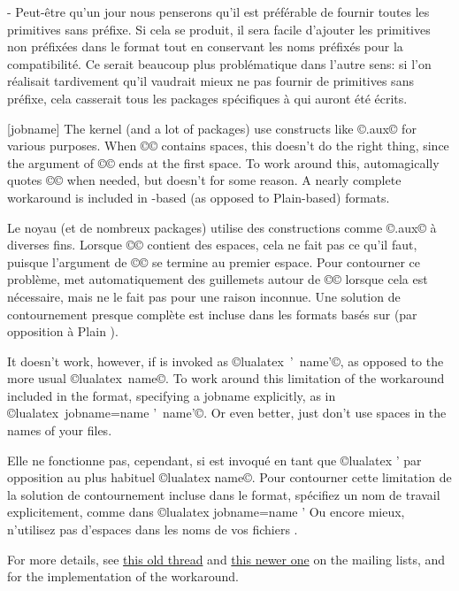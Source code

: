 \documentclass{lltxdoc}
\begin{document}
{- Peut-être qu'un jour nous penserons qu'il est préférable de fournir toutes les primitives sans préfixe. Si cela se produit, il sera facile d'ajouter les primitives non préfixées dans le format tout en conservant les noms préfixés pour la compatibilité. Ce serait beaucoup plus problématique dans l'autre sens: si l'on réalisait tardivement qu'il vaudrait mieux ne pas fournir de primitives sans préfixe, cela casserait tous les packages spécifiques à \luatex qui auront été écrits.

[jobname]
The \latex kernel (and a lot of packages) use constructs like
©\jobname.aux© for various purposes. When ©\jobname© contains spaces,
this doesn't do the right thing, since the argument of ©© ends at the
first space. To work around this, \pdftex automagically quotes ©\jobname© when
needed, but \luatex doesn't for some reason. A nearly complete workaround is
included in \latex-based (as opposed to Plain-based) \luatex formats.

Le noyau \latex (et de nombreux packages) utilise des constructions comme ©\jobname.aux© à diverses fins. Lorsque ©\jobname© contient des espaces, cela ne fait pas ce qu'il faut, puisque l'argument de ©© se termine au premier espace. Pour contourner ce problème, \pdftex met automatiquement des guillemets autour de ©\jobname© lorsque cela est nécessaire, mais \luatex ne le fait pas pour une raison inconnue. Une solution de contournement presque complète est incluse dans les formats \luatex basés sur \latex (par opposition à Plain \tex).

It doesn't work, however, if \luatex is invoked as ©lualatex ' name'©,
as opposed to the more usual ©lualatex name©. To work around this
limitation of the workaround included in the format, specifying a jobname
explicitly, as in ©lualatex jobname=name ' name'©. Or even better, just
don't use spaces in the names of your \tex files.


Elle ne fonctionne pas, cependant, si \luatex est invoqué en tant que ©lualatex ' par opposition au plus habituel ©lualatex name©. Pour contourner cette limitation de la solution de contournement incluse dans le format, spécifiez un nom de travail explicitement, comme dans ©lualatex jobname=name ' Ou encore mieux, n'utilisez pas d'espaces dans les noms de vos fichiers \tex.

For more details, see
\href{http://www.ntg.nl/pipermail/dev-luatex/2009-April/002549.html}{this old
  thread} and
\href{http://tug.org/pipermail/luatex/2010-August/001986.html}{this newer one}
on the \luatex mailing lists, and  for the
implementation of the workaround.

}
\end{document}
